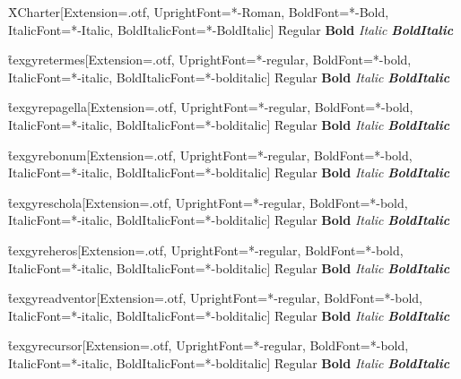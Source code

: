 \documentclass{article}
\newcommand{\sample}[5]{%
  \setfontfamily\f{#1}[Extension=.otf, UprightFont=*#2, BoldFont=*#3,
    ItalicFont=*#4, BoldItalicFont=*#5]%
  {\f Regular \textbf{Bold} \textit{Italic} \textbf{\textit{BoldItalic}}}\par}
\newcommand{\gyre}[1]{\sample{texgyre#1}{-regular}{-bold}{-italic}{-bolditalic}}
\begin{document}
\sample{XCharter}{-Roman}{-Bold}{-Italic}{-BoldItalic}
\gyre{termes}
\gyre{pagella}
\gyre{bonum}
\gyre{schola}
\gyre{heros}
\gyre{adventor}
\gyre{cursor}
\end{document}
